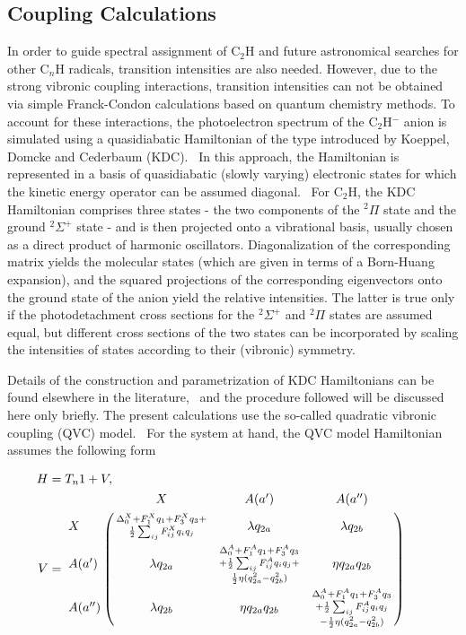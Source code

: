 \documentclass[aip,graphicx]{revtex4-1}
\begin{document}
\subsection{Coupling Calculations}
In order to guide spectral assignment of C$_2$H and future astronomical searches for other C$_n$H radicals, transition intensities are also needed. However, due to the strong vibronic coupling interactions, transition intensities can not be obtained via simple Franck-Condon calculations based on quantum chemistry methods. To account for these interactions, the photoelectron spectrum of the C$_2$H$^-$ anion is simulated using a quasidiabatic Hamiltonian of the type introduced by Koeppel, Domcke and Cederbaum (KDC).~\cite{kou84,dom81} In this approach, the Hamiltonian is represented in a basis of quasidiabatic (slowly varying) electronic  states for which the kinetic energy operator can be assumed diagonal.~\cite{pac93} For C$_2$H, the KDC Hamiltonian comprises three states - the two components of the $^2\Pi$ state and the ground $^2\Sigma^+$ state - and is then projected onto a vibrational basis, usually chosen as a direct product of harmonic oscillators. Diagonalization of the corresponding matrix yields the molecular states (which are given in terms of a Born-Huang expansion), and the squared projections of the corresponding eigenvectors onto the ground state of the anion yield the relative intensities. The latter is true only if the photodetachment cross sections for the $^2\Sigma^+$ and $^2\Pi$ states are assumed equal, but different cross sections of the two states can be incorporated by scaling the intensities of states according to their (vibronic) symmetry.~\cite{sta11} 

Details of the construction and parametrization of KDC Hamiltonians can be found elsewhere in the literature,~\cite{sta21,ich06,ich08,ich09,wei17} and the procedure followed will be discussed here only briefly. The present calculations use the so-called quadratic vibronic coupling (QVC) model.~\cite{ich06} For the system at hand, the QVC model Hamiltonian  assumes the following form

\begin{align}
H &= T_n1+V,\\
V &= \bordermatrix{ & X & A(a') & A(a'') \cr
	X &\substack{\Delta_0^X+F_1^Xq_1+F_3^Xq_3+\\ 
		\frac{1}{2} \sum_{ij}F^X_{ij}q_iq_j}& \lambda q_{2a} & \lambda q_{2b} \cr
	A(a') & \lambda q_{2a} & \substack{\Delta^A_0+F^A_1q_1+F^A_3q_3\\+\frac{1}{2}\sum_{ij}F^A_{ij}q_iq_j+\\\frac{1}{2}\eta(q_{2a}^2-q_{2b}^2)} & \eta q_{2a}q_{2b} \cr
	A(a'') & \lambda q_{2b} & \eta q_{2a}q_{2b} & \substack{\Delta_0^A+F_1^Aq_1+F_3^Aq_3\\+\frac{1}{2}\sum_{ij}F_{ij}^Aq_iq_j\\-\frac{1}{2}\eta(q_{2a}^2-q_{2b}^2) } } \qquad
\label{eq:calc1}
\end{align}
\end{document}
